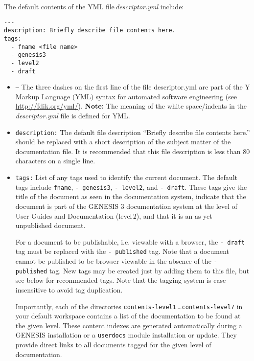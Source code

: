 \documentclass[12pt]{article}
\begin{document}
The default contents of the YML file\,{\it descriptor.yml} include:

\begin{verbatim}
---
description: Briefly describe file contents here. 
tags:
  - fname <file name>
  - genesis3
  - level2
  - draft
\end{verbatim}

\begin{itemize}

\item {\tt ---} The three dashes on the first line of the file descriptor.yml are part of the Y Markup Language (YML) syntax for automated software engineering (see \href{http://fdik.org/yml/}{http://fdik.org/yml/}). {\bf Note:} The meaning of the white space/indents in the\,{\it descriptor.yml} file is defined for YML.  

\item {\tt description:} The default file description ``Briefly describe file contents here.'' should be replaced with a short description of the subject matter of the documentation file. It is recommended that this file description is less than 80 characters on a single line.

\item {\tt tags:} List of any tags used to identify the current document. The default tags include {\tt fname}, {\tt -\,genesis3}, {\tt -\,level2}, and {\tt -\,draft}. These tags give the title of the document as seen in the documentation system, indicate that the document is part of the GENESIS 3 documentation system at the level of User Guides and Documentation (level\,2), and that it is an as yet unpublished document.

For a document to be publishable, i.e. viewable with a browser, the {\tt -\,draft} tag must be replaced with the {\tt -\,published} tag. Note that a document cannot be published to be browser viewable in the absence of the {\tt -\,published} tag. New tags may be created just by adding them to this file, but see below for recommended tags.  Note that the tagging system is case insensitive to avoid tag duplication.

Importantly, each of the directories {\tt contents-level1}\,\ldots {\tt contents-level7} in your default workspace contains a list of the documentation to be found at the given level. These content indexes are generated automatically during a GENESIS installation or a {\tt userdocs} module installation or update. They provide direct links to all documents tagged for the given level of documentation.

\end{itemize}
\end{document}
